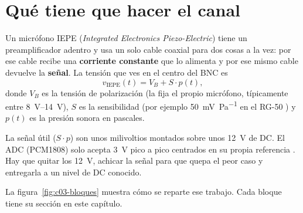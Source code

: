 \section{Qué tiene que hacer el canal}\label{sec:c03-objetivo}

Un micrófono IEPE (\emph{Integrated Electronics Piezo-Electric}) tiene un preamplificador adentro y usa un solo cable
coaxial para dos cosas a la vez: por ese cable recibe una \textbf{corriente constante} que lo alimenta y por ese mismo
cable devuelve la \textbf{señal}. La tensión que ves en el centro del BNC es
\begin{equation}
  v_{\mathrm{IEPE}}(t) = V_B + S\cdot p(t),
  \label{eq:c03-iepe}
\end{equation}
donde $V_B$ es la tensión de polarización (la fija el propio micrófono, típicamente entre \SIrange{8}{14}{\volt}),
$S$ es la sensibilidad (por ejemplo \SI{50}{\milli\volt\per\pascal} en el RG-50 ) y $p(t)$ es la
presión sonora en pascales.

\begin{idea}
La señal útil ($S\cdot p$) son unos milivoltios montados sobre unos \SI{12}{\volt} de DC. El ADC (PCM1808) solo acepta
\SI{3}{\volt} pico a pico centrados en su propia referencia . Hay que quitar los \SI{12}{\volt},
achicar la señal para que quepa el peor caso y entregarla a un nivel de DC conocido.
\end{idea}

La figura~\ref{fig:c03-bloques} muestra cómo se reparte ese trabajo. Cada bloque tiene su sección en este capítulo.

